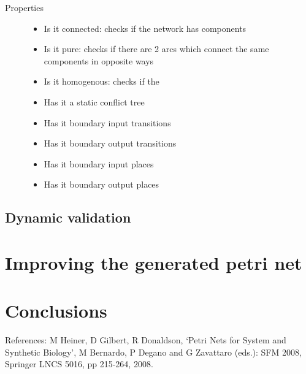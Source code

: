 \documentclass[12pt,a4paper,draft]{article}
\begin{document}
\begin{description}
    \item [Properties]
    
    \begin{itemize}
        \item Is it connected: checks if the network has components
        \item Is it pure: checks if there are 2 arcs which connect the same components in opposite ways
        \item Is it homogenous: checks if the 
        \item Has it a static conflict tree
        \item Has it boundary input transitions
        \item Has it boundary output transitions
        \item Has it boundary input places
        \item Has it boundary output places
    \end{itemize}
    
    \end{description}
    

\subsection{Dynamic validation}\label{sec:dynamic_validation}

\section{Improving the generated petri net}\label{sec:improvments}


\section{Conclusions}\label{sec:conclusions}
    
    
    
    References:
    M Heiner, D Gilbert, R Donaldson, ‘Petri Nets for System and Synthetic Biology’, M Bernardo, P Degano and G Zavattaro (eds.): SFM 2008, Springer LNCS 5016, pp 215-264, 2008.
    



\end{document}
